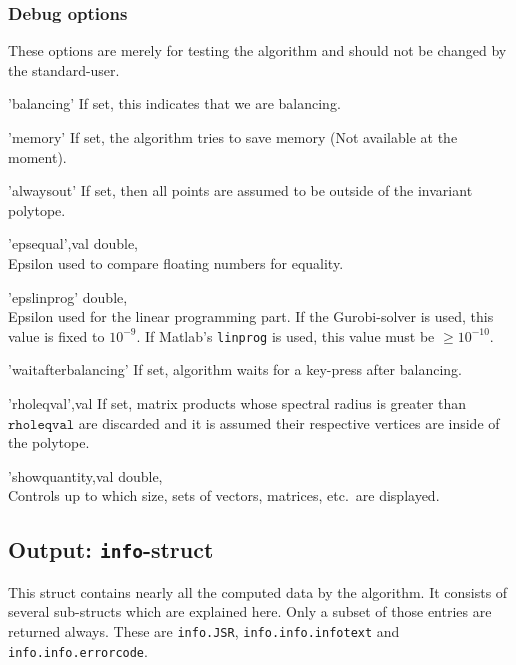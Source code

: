 \subsubsection{Debug options} These options are merely for testing the algorithm and should not be changed by the standard-user.
\begin{param}
\item['balancing'] If set, this indicates that we are balancing.
\item['memory'] If set, the algorithm tries to save memory (Not available at the moment).
\item['alwaysout'] If set, then all points are assumed to be outside of the invariant polytope.
\item['epsequal',val] double, \\Epsilon used to compare floating numbers for equality.

\item['epslinprog'] double, \\Epsilon used for the linear programming part. If the Gurobi-solver is used, this value is fixed to $10^{-9}$. If Matlab's \texttt{linprog} is used, this value must be $\geq10^{-10}$.

\item['waitafterbalancing'] If set, algorithm waits for a key-press after balancing.
\item['rholeqval',val] If set, matrix products whose spectral radius is greater than $\texttt{rholeqval}$ are discarded and it is assumed their respective vertices are inside of the polytope.

\item['showquantity,val] double, \\Controls up to which size, sets of vectors, matrices, etc.\ are displayed.
\end{param}


\subsection{Output: \texttt{info}-struct}
This struct contains nearly all the computed data by the algorithm. It consists of several sub-structs which are explained here. Only a subset of those entries are returned always. These are
\texttt{info.JSR}, \texttt{info.info.infotext} and \texttt{info.info.errorcode}.


